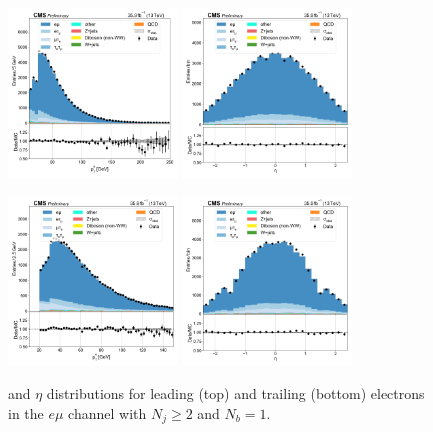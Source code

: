 \begin{figure}[htb!]
    \centering
    \includegraphics[width=0.4\textwidth]{chapters/Appendix/sectionPlots/figures/data_mc_overlays/emu_2016_cat_gt2_gt2_a_signal_linear_lepton_lepton1_pt}
    \includegraphics[width=0.4\textwidth]{chapters/Appendix/sectionPlots/figures/data_mc_overlays/emu_2016_cat_gt2_gt2_a_signal_linear_lepton_lepton1_eta}

    \includegraphics[width=0.4\textwidth]{chapters/Appendix/sectionPlots/figures/data_mc_overlays/emu_2016_cat_gt2_gt2_a_signal_linear_lepton_lepton2_pt}
    \includegraphics[width=0.4\textwidth]{chapters/Appendix/sectionPlots/figures/data_mc_overlays/emu_2016_cat_gt2_gt2_a_signal_linear_lepton_lepton2_eta}
    \caption{\pt and $\eta$ distributions for leading (top) and trailing
        (bottom) electrons in the $e\mu$ channel with $N_{j} \geq 2$ and
        $N_{b} = 1$.}
    \label{fig:emu_6_kinematic}
\end{figure}

